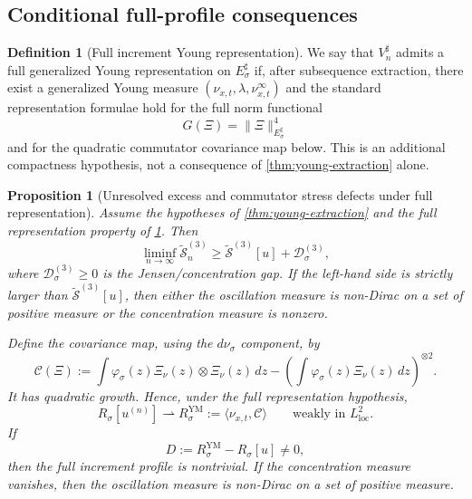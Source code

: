 \documentclass[11pt]{article}
\numberwithin{equation}{section}
\theoremstyle{plain}
\newtheorem{proposition}[theorem]{Proposition}
\theoremstyle{definition}
\newtheorem{definition}[theorem]{Definition}
\theoremstyle{remark}
\begin{document}
\subsection{Conditional full-profile consequences}

\begin{definition}[Full increment Young representation]\label{def:full-ym-assumption}
We say that $V^\sharp_n$ admits a full generalized Young representation on $E^\sharp_\sigma$ if, after subsequence extraction, there exist a generalized Young measure $(\nu_{x,t},\lambda,\nu^\infty_{x,t})$ and the standard representation formulae hold for the full norm functional
\[
G(\Xi)=\|\Xi\|_{E^\sharp_\sigma}^{4}
\]
and for the quadratic commutator covariance map below.  This is an additional compactness hypothesis, not a consequence of \cref{thm:young-extraction} alone.
\end{definition}

\begin{proposition}[Unresolved excess and commutator stress defects under full representation]\label{prop:comm-stress-defect}
Assume the hypotheses of \cref{thm:young-extraction} and the full representation property of \cref{def:full-ym-assumption}.  Then
\[
\liminf_{n\to\infty}\widetilde{\mathcal S}^{(3)}_n
\ge
\widetilde{\mathcal S}^{(3)}[u]+\mathcal D^{(3)}_\sigma,
\]
where $\mathcal D^{(3)}_\sigma\ge0$ is the Jensen/concentration gap.  If the left-hand side is strictly larger than $\widetilde{\mathcal S}^{(3)}[u]$, then either the oscillation measure is non-Dirac on a set of positive measure or the concentration measure is nonzero.

Define the covariance map, using the $d\nu_\sigma$ component, by
\begin{equation}\label{eq:covariance-map-safe}
\mathcal C(\Xi)
:=
\int\varphi_\sigma(z)\Xi_\nu(z)\otimes\Xi_\nu(z)\,dz
-
\left(\int\varphi_\sigma(z)\Xi_\nu(z)\,dz\right)^{\otimes2}.
\end{equation}
It has quadratic growth.  Hence, under the full representation hypothesis,
\[
R_\sigma[u^{(n)}]\rightharpoonup R^{\mathrm{YM}}_\sigma:=\langle\nu_{x,t},\mathcal C\rangle
\qquad\text{weakly in }L^2_{\mathrm{loc}}.
\]
If
\[
D:=R^{\mathrm{YM}}_\sigma-R_\sigma[u]\ne0,
\]
then the full increment profile is nontrivial.  If the concentration measure vanishes, then the oscillation measure is non-Dirac on a set of positive measure.
\end{proposition}
\end{document}
